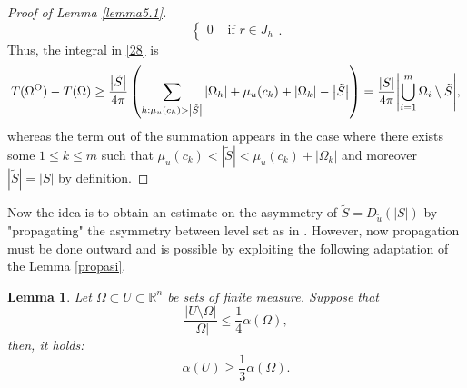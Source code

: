 \documentclass[oneside,a4paper,11pt,notitlepage]{article}
\newcommand{\abs}[1]{{\left|#1\right|}}
\theoremstyle{definition}
\theoremstyle{plain}
\newtheorem{lemma}[theorem]{Lemma}
\theoremstyle{definition}
\newcommand{\OO}{\text{\normalfont  O}}
\begin{document}
\begin{proof}[Proof of Lemma \ref{lemma5.1}]
\begin{equation*}
\begin{cases}
			\displaystyle{0} & \text{ if } r\in J_h
		\end{cases}.
	\end{equation*}
	Thus, the integral in  \eqref{28} is
	\begin{equation*}
		T(\Omega^\OO)-T(\Omega)\geq\frac{\abs{\tilde{S}}}{4\pi}\left(\sum_{h:\mu_u(c_h)>\abs{\tilde{S}}}\abs{\Omega_h}+\mu_u(c_k)+\abs{\Omega_k}-\abs{\tilde{S}}\right)=\frac{\abs{S}}{4\pi}\abs{\bigcup_{i=1}^m\Omega_i\setminus\tilde{S}},
	\end{equation*}
	whereas the term out of the summation appears in the case where there exists some $1\leq k\leq m$ such that $\mu_u(c_k)<\abs{\tilde{S}}<\mu_u(c_k)+\abs{\Omega_k}$ and moreover $\abs{\tilde S}=\abs{S}$ by definition. 
\end{proof}

 Now the idea is to obtain an estimate on the asymmetry of $\tilde S=D_{\tilde u}(\abs{S})$ by "propagating" the asymmetry between level set as in \cite{BD}. However, now propagation must be done outward and is possible by exploiting the following adaptation of the Lemma \ref{propasi}.
\begin{lemma}\label{propasiback}
    Let $\Omega \subset U \subset \mathbb{R}^n$ be sets of finite measure. Suppose that 
    \[ \frac{|U \setminus \Omega|}{|\Omega|} \leq \frac{1}{4} \alpha(\Omega), \] 
    then, it holds: 
    \[ \alpha(U) \geq \frac{1}{3} \alpha(\Omega). \]
\end{lemma}
\end{document}
